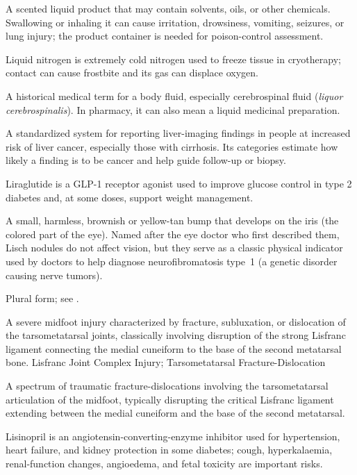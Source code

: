  A scented liquid product that may contain solvents, oils, or other chemicals. Swallowing or inhaling it can cause irritation, drowsiness, vomiting, seizures, or lung injury; the product container is needed for poison-control assessment.

 Liquid nitrogen is extremely cold nitrogen used to freeze tissue in cryotherapy; contact can cause frostbite and its gas can displace oxygen.

 A historical medical term for a body fluid, especially cerebrospinal fluid (\textit{liquor cerebrospinalis}). In pharmacy, it can also mean a liquid medicinal preparation.

 A standardized system for reporting liver-imaging findings in people at increased risk of liver cancer, especially those with cirrhosis. Its categories estimate how likely a finding is to be cancer and help guide follow-up or biopsy.

 Liraglutide is a GLP-1 receptor agonist used to improve glucose control in type 2 diabetes and, at some doses, support weight management.

 A small, harmless, brownish or yellow-tan bump that develops on the iris (the colored part of the eye). Named after the eye doctor who first described them, Lisch nodules do not affect vision, but they serve as a classic physical indicator used by doctors to help diagnose neurofibromatosis type~1 (a genetic disorder causing nerve tumors).

 Plural form; see .

 A severe midfoot injury characterized by fracture, subluxation, or dislocation of the tarsometatarsal joints, classically involving disruption of the strong Lisfranc ligament connecting the medial cuneiform to the base of the second metatarsal bone.
\synonyms
Lisfranc Joint Complex Injury; Tarsometatarsal Fracture-Dislocation

 A spectrum of traumatic fracture-dislocations involving the tarsometatarsal articulation of the midfoot, typically disrupting the critical Lisfranc ligament extending between the medial cuneiform and the base of the second metatarsal.

 Lisinopril is an angiotensin-converting-enzyme inhibitor used for hypertension, heart failure, and kidney protection in some diabetes; cough, hyperkalaemia, renal-function changes, angioedema, and fetal toxicity are important risks.

